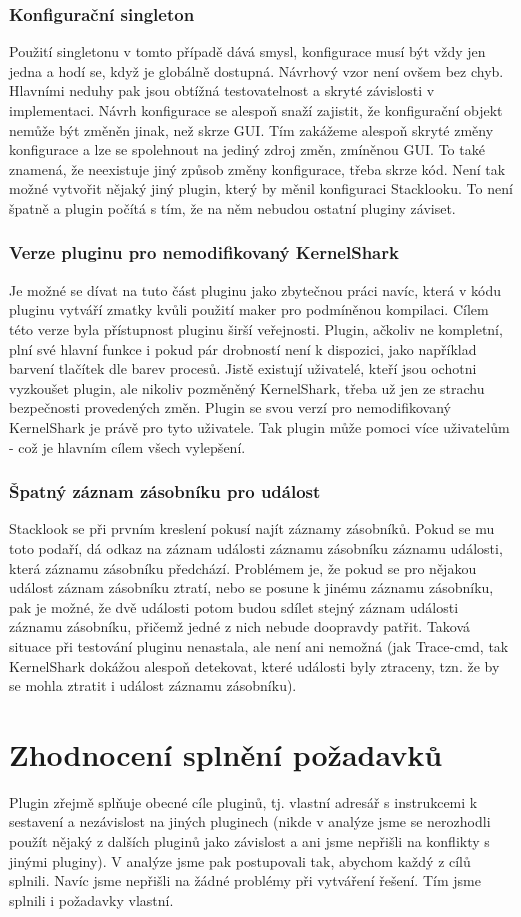 \subsubsection*{Konfigurační singleton}
Použití singletonu v tomto případě dává smysl, konfigurace musí být vždy jen jedna a hodí se, když je globálně dostupná. Návrhový vzor není ovšem bez chyb. Hlavními neduhy pak jsou obtížná testovatelnost a skryté závislosti v implementaci. Návrh konfigurace se alespoň snaží zajistit, že konfigurační objekt nemůže být změněn jinak, než skrze GUI. Tím zakážeme alespoň skryté změny konfigurace a lze se spolehnout na jediný zdroj změn, zmíněnou GUI. To také znamená, že neexistuje jiný způsob změny konfigurace, třeba skrze kód. Není tak možné vytvořit nějaký jiný plugin, který by měnil konfiguraci Stacklooku. To není špatně a plugin počítá s tím, že na něm nebudou ostatní pluginy záviset.

\subsubsection*{Verze pluginu pro nemodifikovaný KernelShark}
Je možné se dívat na tuto část pluginu jako zbytečnou práci navíc, která v kódu pluginu vytváří zmatky kvůli použití maker pro podmíněnou kompilaci. Cílem této verze byla přístupnost pluginu širší veřejnosti. Plugin, ačkoliv ne kompletní, plní své hlavní funkce i pokud pár drobností není k dispozici, jako například barvení tlačítek dle barev procesů. Jistě existují uživatelé, kteří jsou ochotni vyzkoušet plugin, ale nikoliv pozměněný KernelShark, třeba už jen ze strachu bezpečnosti provedených změn. Plugin se svou verzí pro nemodifikovaný KernelShark je právě pro tyto uživatele. Tak plugin může pomoci více uživatelům - což je hlavním cílem všech vylepšení.

\subsubsection*{Špatný záznam zásobníku pro událost}
Stacklook se při prvním kreslení pokusí najít záznamy zásobníků. Pokud se mu toto podaří, dá odkaz na záznam události záznamu zásobníku záznamu události, která záznamu zásobníku předchází. Problémem je, že pokud se pro nějakou událost záznam zásobníku ztratí, nebo se posune k jinému záznamu zásobníku, pak je možné, že dvě události potom budou sdílet stejný záznam události záznamu zásobníku, přičemž jedné z nich nebude doopravdy patřit. Taková situace při testování pluginu nenastala, ale není ani nemožná (jak Trace-cmd, tak KernelShark dokážou alespoň detekovat, které události byly ztraceny, tzn. že by se mohla ztratit i událost záznamu zásobníku). 

\section{Zhodnocení splnění požadavků}
Plugin zřejmě splňuje obecné cíle pluginů, tj. vlastní adresář s instrukcemi k sestavení a nezávislost na jiných pluginech (nikde v analýze jsme se nerozhodli použít nějaký z dalších pluginů jako závislost a ani jsme nepřišli na konflikty s jinými pluginy). V analýze jsme pak postupovali tak, abychom každý z cílů splnili. Navíc jsme nepřišli na žádné problémy při vytváření řešení. Tím jsme splnili i požadavky vlastní.